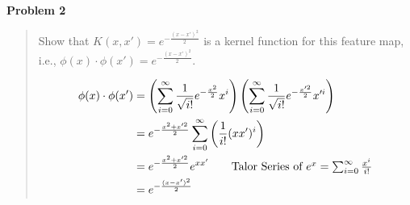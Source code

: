 {\bf Problem 2}
\begin{quote}
    Show that $K(x, x') = e^{-\frac{(x-x')^2}{2}}$ is a kernel function for this feature map, i.e., $\phi(x) \cdot \phi(x') = e^{-\frac{(x-x')^2}{2}}$.

    \begin{align*}
	\phi(x) \cdot \phi(x') &= \left( \sum_{i=0}^{\infty} \frac{1}{\sqrt{i!}} e^{- \frac{x^2}{2}} x^i \right) \left( \sum_{i=0}^{\infty} \frac{1}{\sqrt{i!}} e^{- \frac{x'^2}{2}} x'^i \right) \\
	    &= e^{- \frac{x^2 + x'^2}{2}} \sum_{i=0}^{\infty} \left( \frac{1}{i!} (xx')^i \right) \\
	    &= e^{- \frac{x^2 + x'^2}{2}} e^{xx'} \tag*{Talor Series of $e^x = \sum_{i=0}^{\infty} \frac{x^i}{i!}$} \\
	    &= e^{- \frac{(x - x')^2}{2}}
    \end{align*}
\end{quote}
